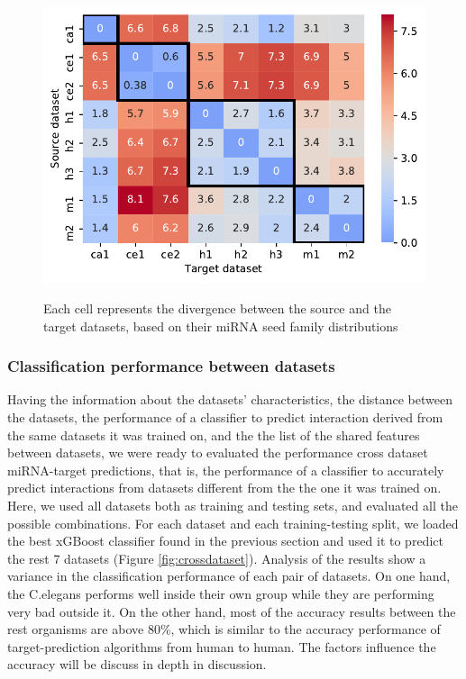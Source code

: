 \documentclass{bmcart}
\begin{document}

\begin{figure}[h!]
  \caption{ Each cell represents the divergence between the source and the target datasets, based on their miRNA seed family distributions}
      \includegraphics[width = 1\textwidth]{Results/divergence.pdf}
      \label{fig:divergence}
      \end{figure}


\subsubsection*{Classification performance between datasets}
Having the information about the datasets' characteristics, the distance between the datasets, the performance of a classifier to predict interaction derived from the same datasets it was trained on, and the the list of the shared features between datasets, we were ready to evaluated the performance cross dataset miRNA-target predictions, that is, the performance of a classifier to accurately predict interactions from datasets different from the the one it was trained on. Here, we used all datasets both as training and testing sets, and evaluated all the possible combinations. For each dataset and each training-testing split, we loaded the best xGBoost classifier found in the previous section and used it to predict the rest 7 datasets (Figure \ref{fig:crossdataset}). 
Analysis of the results show a variance in the classification performance of each pair of datasets. On one hand, the C.elegans performs well inside their own group while they are performing very bad outside it. On the other hand, most of the accuracy results between the rest organisms are above 80\%, which is similar to the accuracy performance of target-prediction algorithms from human to human. The factors influence the accuracy will be discuss in depth in discussion.
\end{document}
